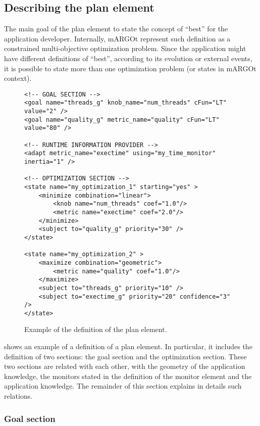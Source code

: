 \subsection{Describing the plan element}

The main goal of the plan element to state the concept of ``best'' for the application developer.
Internally, mARGOt represent such definition as a constrained multi-objective optimization problem.
Since the application might have different definitions of ``best'', according to its evolution or external events, it is possible to state more than one optimization problem (or states in mARGOt context).



\begin{figure}
\lstset{language=XML}
\begin{lstlisting}
<!-- GOAL SECTION -->
<goal name="threads_g" knob_name="num_threads" cFun="LT" value="2" />
<goal name="quality_g" metric_name="quality" cFun="LT" value="80" />

<!-- RUNTIME INFORMATION PROVIDER -->
<adapt metric_name="exectime" using="my_time_monitor" inertia="1" />

<!-- OPTIMIZATION SECTION -->
<state name="my_optimization_1" starting="yes" >
	<minimize combination="linear">
		<knob name="num_threads" coef="1.0"/>
		<metric name="exectime" coef="2.0"/>
	</minimize>
	<subject to="quality_g" priority="30" />
</state>

<state name="my_optimization_2" >
	<maximize combination="geometric">
		<metric name="quality" coef="1.0"/>
	</maximize>
	<subject to="threads_g" priority="10" />
	<subject to="exectime_g" priority="20" confidence="3" />
</state>

\end{lstlisting}
\caption{Example of the definition of the plan element.}
\label{code:plan_xml}
\end{figure}

 shows an example of a definition of a plan element.
In particular, it includes the definition of two sections: the goal section and the optimization section.
These two sections are related with each other, with the geometry of the application knowledge, the monitors stated in the definition of the monitor element and the application knowledge.
The remainder of this section explains in details such relations.

\subsubsection*{Goal section}
\label{ssec:goal}


